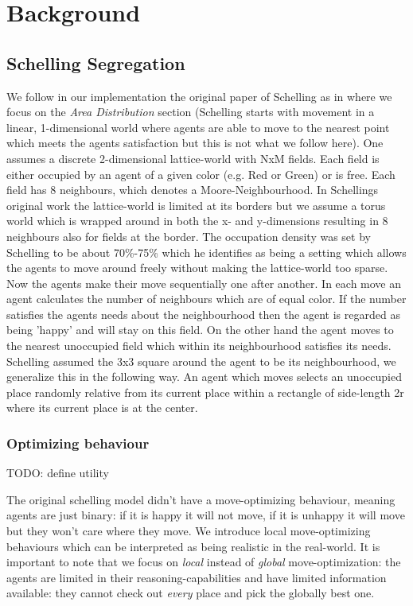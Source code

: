 \section{Background}

\subsection{Schelling Segregation}
We follow in our implementation the original paper of Schelling as in \cite{schelling_dynamic_1971} where we focus on the \textit{Area Distribution} section (Schelling starts with movement in a linear, 1-dimensional world where agents are able to move to the nearest point which meets the agents satisfaction but this is not what we follow here). One assumes a discrete 2-dimensional lattice-world with NxM fields. Each field is either occupied by an agent of a given color (e.g. Red or Green) or is free. Each field has 8 neighbours, which denotes a Moore-Neighbourhood. In Schellings original work the lattice-world is limited at its borders but we assume a torus world which is wrapped around in both the x- and y-dimensions resulting in 8 neighbours also for fields at the border. The occupation density was set by Schelling to be about 70\%-75\% which he identifies as being a setting which allows the agents to move around freely without making the lattice-world too sparse.
Now the agents make their move sequentially one after another. In each move an agent calculates the number of neighbours which are of equal color. If the number satisfies the agents needs about the neighbourhood then the agent is regarded as being 'happy' and will stay on this field. On the other hand the agent moves to the nearest unoccupied field which within its neighbourhood satisfies its needs. Schelling assumed the 3x3 square around the agent to be its neighbourhood, we generalize this in the following way. An agent which moves selects an unoccupied place randomly relative from its current place within a rectangle of side-length 2r where its current place is at the center.


\subsubsection{Optimizing behaviour}
TODO: define utility

The original schelling model didn't have a move-optimizing behaviour, meaning agents are just binary: if it is happy it will not move, if it is unhappy it will move but they won't care where they move. We introduce local move-optimizing behaviours which can be interpreted as being realistic in the real-world. It is important to note that we focus on \textit{local} instead of \textit{global} move-optimization: the agents are limited in their reasoning-capabilities and have limited information available: they cannot check out \textit{every} place and pick the globally best one.\\

